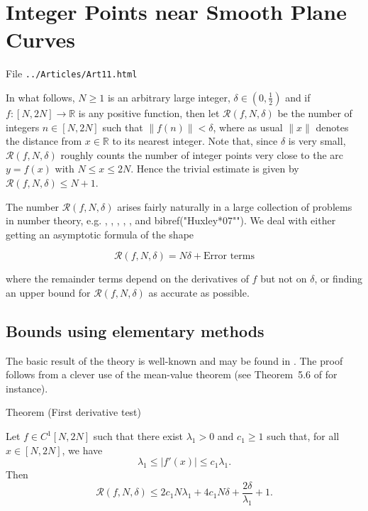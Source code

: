 \chapter{   Integer Points near Smooth Plane Curves}

File \texttt{../Articles/Art11.html}










 
 


In what follows, $N \geqslant 1$ is an arbitrary large integer, $\delta \in
\left( 0,\frac{1}{2} \right)$ and if $f : [N,2N] \longrightarrow \mathbb {R}$
is any positive function, then let $\mathcal {R}(f,N,\delta)$ be the number of
integers $n \in [N,2N]$ such that $\lVert f(n) \rVert < \delta$, where as
usual $\lVert x \rVert$ denotes the distance from $x \in \mathbb {R}$ to its
nearest integer. Note that, since $\delta$ is very small, $\mathcal
{R}(f,N,\delta)$ roughly counts the number of integer points very close to the
arc $y = f(x)$ with $N \leqslant x \leqslant 2N$. Hence the trivial estimate
is given by $\mathcal {R}(f,N,\delta) \leqslant N+1$.  


The number $\mathcal {R}(f,N,\delta)$ arises fairly naturally in a large
collection of problems in number theory, e.g.
\cite{Filaseta*90},
\cite{Filaseta-Trifonov*96},
\cite{Huxley*96},
\cite{Huxley-Sargos*95},
\cite{Huxley-Sargos*06},
\cite{Huxley-Trifonov*96} and
bibref("Huxley*07"").
We deal with either getting an
asymptotic formula of the shape 

$$\mathcal {R}(f,N,\delta) = N \delta + \textrm{Error terms}$$

where the remainder terms depend on the derivatives of $f$ but not on
$\delta$, or finding an upper bound for $\mathcal {R}(f,N,\delta)$ as accurate
as possible.  



\section{Bounds using elementary methods
}


The basic result of the theory is well-known and may be found in
\cite{Vinogradov*54}.
The proof follows from a clever use of the mean-value theorem (see
Theorem~5.6 of 
\cite{Bordelles*12} for instance).
\begin{thm}{Theorem (First derivative test)}

Let $f \in C^1 [N,2N]$ such that there exist $\lambda_1 >0$ and $c_1 \geqslant 1$ such that, for all $x \in [N,2N]$, we have
$$
   \lambda_1 \leqslant \bigl | f'(x) \bigr | \leqslant c_1 \lambda_1.
$$
Then
$$
  \mathcal {R}(f,N,\delta) \leqslant 2 c_1 N \lambda_1 + 4c_1 N \delta + \frac{2 \delta}{\lambda_1} + 1.$$
\end{thm}



